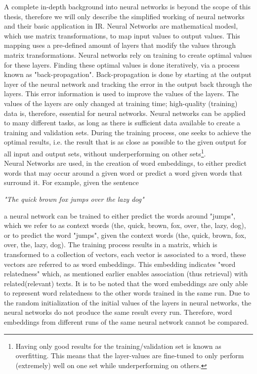 \documentclass[../../Thesis.tex]{subfiles}
\begin{document}
A complete in-depth background into neural networks is beyond the scope of this thesis, therefore we will only describe the simplified working of neural networks and their basic application in IR.
Neural Networks are mathematical modesl\cite{funahashi1989approximate}, which use matrix transformations, to map input values to output values. This mapping uses a pre-defined amount of layers that modify the values through matrix transformations. Neural networks rely on training to create optimal values for these layers. Finding these optimal values is done iteratively, via a process known as "back-propagation". Back-propagation is done by starting at the output layer of the neural network and tracking the error in the output back through the layers. This error information is used to improve the values of the layers. The values of the layers are only changed at training time; high-quality (training) data is, therefore, essential for neural networks\cite{Truong2017Thesis, lai2016generate}. Neural networks can be applied to many different tasks, as long as there is sufficient data available to create a training and validation sets. During the training process, one seeks to achieve the optimal results, i.e. the result that is as close as possible to the given output for all input and output sets, without underperforming on other sets\footnote{Having only good results for the training/validation set is known as overfitting. This means that the layer-values are fine-tuned to only perform (extremely) well on one set while underperforming on others.}.\\Neural Networks are used, in the creation of word embeddings, to either predict words that may occur around a given word or predict a word given words that surround it. For example, given the sentence\\
\begin{center}
\textit{"The quick brown fox jumps over the lazy dog"}
\end{center}
a neural network can be trained to either predict the words around "jumps", which we refer to as context words (the, quick, brown, fox, over, the, lazy, dog), or to predict the word "jumps", given the context words (the, quick, brown, fox, over, the, lazy, dog). The training process results in a matrix, which is transformed to a collection of vectors, each vector is associated to a word, these vectors are referred to as word embeddings. This embedding indicates "word relatedness" which, as mentioned earlier enables association (thus retrieval) with related(relevant) texts. It is to be noted that the word embeddings are only able to represent word relatedness to the other words trained in the same run. Due to the random initialization of the initial values of the layers in  neural networks, the neural networks do not produce the same result every run. Therefore, word embeddings from different runs of the same neural network cannot be compared.
\end{document}
